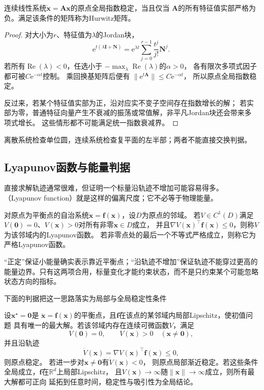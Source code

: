 \begin{theorem}[连续线性系统的指数稳定性]
	\label{thm:dynamical-continuous-spectral-stability}
	连续线性系统$\dot{\bm{x}}=\bm{A}\bm{x}$的原点全局指数稳定，当且仅当
	$\bm{A}$的所有特征值实部严格为负。满足该条件的矩阵称为Hurwitz矩阵。
\end{theorem}

\begin{proof}
	对大小为$r$、特征值为$\lambda$的Jordan块，
	\[
		\mathrm{e}^{t(\lambda\bm{I}+\bm{N})}
		=\mathrm{e}^{\lambda t}\sum_{j=0}^{r-1}\frac{t^j}{j!}\bm{N}^j.
	\]
	若所有$\operatorname{Re}(\lambda)<0$，任选小于
	$-\max_\lambda\operatorname{Re}(\lambda)$的$\alpha>0$，
	各有限次多项式因子都可被$C\mathrm{e}^{-\alpha t}$控制。
	乘回换基矩阵后便有
	$\lVert\mathrm{e}^{t\bm{A}}\rVert\leq C\mathrm{e}^{-\alpha t}$，
	所以原点全局指数稳定。

	反过来，若某个特征值实部为正，沿对应实不变子空间存在指数增长的解；
	若实部为零，普通特征向量产生不衰减的振荡或常值解，非平凡Jordan块还会带来多项式增长。
	这些情形都不可能满足统一指数衰减界。
\end{proof}

离散系统检查单位圆，连续系统检查复平面的左半部；两者不能直接交换判据。

\subsection{Lyapunov函数与能量判据}

直接求解轨迹通常很难，但证明一个标量沿轨迹不增加可能容易得多。
（Lyapunov function）就是这样的偏离尺度；它不必等于物理能量。
\begin{definition}[Lyapunov函数]
\label{def:dynamical-lyapunov-function}
对原点为平衡点的自治系统$\dot{\bm x}=\bm f(\bm x)$，设$D$为原点的邻域。
若$V\in C^1(D)$满足$V(\bm0)=0$、$V(\bm x)>0$对所有非零$\bm x\in D$成立，
并且$\nabla V(\bm x)^\top\bm f(\bm x)\leq0$，则称$V$为该邻域内的Lyapunov函数。
若非零点处的最后一个不等式严格成立，则称它为严格Lyapunov函数。
\end{definition}
“正定”保证小能量确实表示靠近平衡点；“沿轨迹不增加”保证轨迹不能穿过更高的
能量边界。只有这两项合用，标量变化才能约束状态，而不是只约束某个可能忽略状态方向的指标。

下面的判据把这一思路落实为局部与全局稳定性条件
\begin{theorem}[连续时间Lyapunov判据]
	\label{thm:dynamical-nonlinear-lyapunov} 设$\bm{x}^{\star}=\bm{0}$是 $\dot{\bm{x}}
=\bm{f}(\bm{x})$的平衡点，且$\bm{f}$在该点的某邻域内局部Lipschitz，使初值问题
具有唯一的最大解。若该邻域内存在连续可微函数$V$，满足
	\[
		V(\bm{0})=0,\qquad V(\bm{x})>0\quad(\bm{x}\neq\bm{0}),
	\]
	并且沿轨迹
	\[
		\dot V(\bm{x}) = \nabla V(\bm{x})^{\top}\bm{f}(\bm{x}) \leq0,
	\]
	则原点稳定。 若进一步对$\bm{x}\neq\bm{0}$有$\dot V(\bm{x})<0$，
则原点局部渐近稳定。若这些条件全局成立，$\bm{f}$在$\mathbb{R}^d$上局部Lipschitz，
且$V(\bm{x})\to\infty$随$\lVert\bm{x}\rVert\to\infty$成立，则所有最大解都可正向
延拓到任意时间，稳定性与吸引性为全局结论。
\end{theorem}

